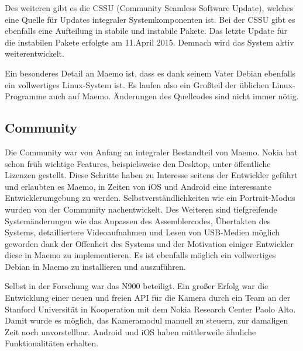 Des weiteren gibt es die CSSU\thinspace\cite{online:maemo-cssu} (Community Seamless Software Update), welches eine Quelle für Updates integraler Systemkomponenten ist. Bei der CSSU gibt es ebenfalls eine Aufteilung in stabile und instabile Pakete. Das letzte Update für die instabilen Pakete erfolgte am 11.\@ April 2015\thinspace\cite{online:maemo-cssuchangelog}. Demnach wird das System aktiv weiterentwickelt.

Ein besonderes Detail an Maemo ist, dass es dank seinem Vater Debian ebenfalls ein vollwertiges Linux-System ist. Es laufen also ein Großteil der üblichen Linux-Programme auch auf Maemo. Änderungen des Quellcodes sind nicht immer nötig.
\newline

\subsection{Community}
Die Community war von Anfang an integraler Bestandteil von Maemo. Nokia hat schon früh wichtige Features, beispielsweise den Desktop, unter öffentliche Lizenzen gestellt\thinspace\cite{online:maemo-hildon}. Diese Schritte haben zu Interesse seitens der Entwickler geführt und erlaubten es Maemo, in Zeiten von iOS und Android eine interessante Entwicklerumgebung zu werden. Selbstverständlichkeiten wie ein Portrait-Modus wurden von der Community nachentwickelt\thinspace\cite{online:maemo-portrait}. Des Weiteren sind tiefgreifende Systemänderungen wie das Anpassen des Assemblercodes\thinspace\cite{online:maemo-thumb}, Übertakten des Systems\thinspace\cite{online:maemo-overclocking}, detailliertere Videoaufnahmen\thinspace\cite{online:maemo-hdvideo} und Lesen von \mbox{USB-Medien}\thinspace\cite{online:maemo-usbhost}  möglich geworden dank der Offenheit des Systems und der Motivation einiger Entwickler diese in Maemo zu implementieren. Es ist ebenfalls möglich ein vollwertiges Debian in Maemo zu installieren und auszuführen\thinspace\cite{online:maemo-easydebian}\thinspace\cite{online:maemo-easydebianwiki}.

Selbst in der Forschung war das N900 beteiligt. Ein großer Erfolg war die Entwicklung einer neuen und freien API für die Kamera durch ein Team an der Stanford Universität in Kooperation mit dem Nokia Research Center Paolo Alto\thinspace\cite{online:maemo-fcam}. Damit wurde es möglich, das Kameramodul manuell zu steuern, zur damaligen Zeit noch unvorstellbar. Android und iOS haben mittlerweile ähnliche Funktionalitäten erhalten\thinspace\cite{online:maemo-fcamlegacy}.


